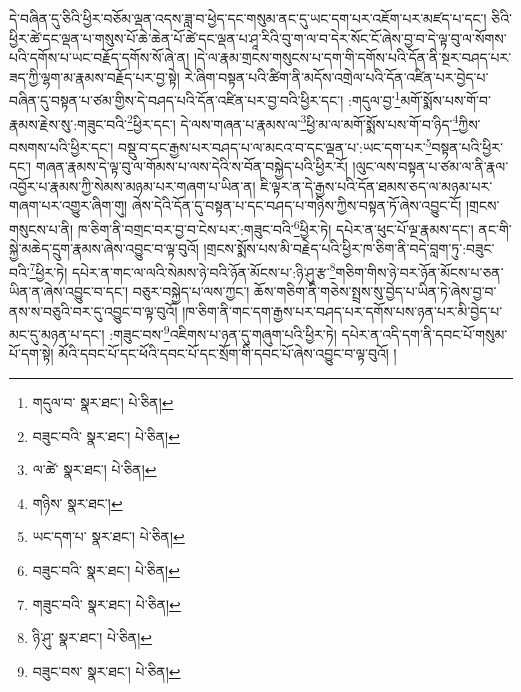 དེ་བཞིན་དུ་ཅིའི་ཕྱིར་བཅོམ་ལྡན་འདས་ཟླ་བ་ཕྱེད་དང་གསུམ་ནང་དུ་ཡང་དག་པར་འཇོག་པར་མཛད་པ་དང་། ཅིའི་ཕྱིར་ཚེ་དང་ལྡན་པ་གསུས་པོ་ཆེ་ཆེན་པོ་ཚེ་དང་ལྡན་པ་ཤཱ་རིའི་བུ་ག་ལ་བ་དེར་སོང་ངོ་ཞེས་བྱ་བ་དེ་ལྟ་བུ་ལ་སོགས་པའི་དགོས་པ་ཡང་བརྗོད་དགོས་སོ་ཞེ་ན། །དེ་ལ་རྣམ་གྲངས་གསུངས་པ་དག་གི་དགོས་པའི་དོན་ནི་སྔར་བཤད་པར་ཟད་ཀྱི་ལྷག་མ་རྣམས་བརྗོད་པར་བྱ་སྟེ། རེ་ཞིག་བསྟན་པའི་ཚིག་ནི་མདོས་འགྲེལ་པའི་དོན་འཛིན་པར་བྱེད་པ་བཞིན་དུ་བསྟན་པ་ཙམ་གྱིས་དེ་བཤད་པའི་དོན་འཛིན་པར་བྱ་བའི་ཕྱིར་དང་། :གདུལ་བྱ་\footnote{གདུལ་བ་  སྣར་ཐང་།  པེ་ཅིན། }མགོ་སྨོས་པས་གོ་བ་རྣམས་རྗེས་སུ་:གཟུང་བའི་\footnote{བཟུང་བའི་  སྣར་ཐང་།  པེ་ཅིན། }ཕྱིར་དང་། དེ་ལས་གཞན་པ་རྣམས་ལ་\footnote{ལ་ཚེ་  སྣར་ཐང་།  པེ་ཅིན། }ཕྱི་མ་ལ་མགོ་སྨོས་པས་གོ་བ་ཉིད་\footnote{གཉིས་  སྣར་ཐང་། }ཀྱིས་བསགས་པའི་ཕྱིར་དང་། བསྡུ་བ་དང་རྒྱས་པར་བཤད་པ་ལ་མངའ་བ་དང་ལྡན་པ་:ཡང་དག་པར་\footnote{ཡང་དག་པ་  སྣར་ཐང་།  པེ་ཅིན། }བསྟན་པའི་ཕྱིར་དང་། གཞན་རྣམས་དེ་ལྟ་བུ་ལ་གོམས་པ་ལས་དེའི་ས་བོན་བསྐྱེད་པའི་ཕྱིར་རོ། །ལུང་ལས་བསྟན་པ་ཙམ་ལ་ནི་རྣལ་འབྱོར་པ་རྣམས་ཀྱི་སེམས་མཉམ་པར་གཞག་པ་ཡིན་ན། ཇི་ལྟར་ན་དེ་རྒྱས་པའི་དོན་ཐམས་ཅད་ལ་མཉམ་པར་གཞག་པར་འགྱུར་ཞིག་གུ། ཞེས་དེའི་དོན་དུ་བསྟན་པ་དང་བཤད་པ་གཉིས་ཀྱིས་བསྟན་ཏོ་ཞེས་འབྱུང་ངོ། །གྲངས་གསུངས་པ་ནི། ཁ་ཅིག་ནི་བགྲང་བར་བྱ་བ་ངེས་པར་:གཟུང་བའི་\footnote{བཟུང་བའི་  སྣར་ཐང་།  པེ་ཅིན། }ཕྱིར་ཏེ། དཔེར་ན་ཕུང་པོ་ལྔ་རྣམས་དང་། ནང་གི་སྐྱེ་མཆེད་དྲུག་རྣམས་ཞེས་འབྱུང་བ་ལྟ་བུའོ། །གྲངས་སྨོས་པས་མི་བརྗེད་པའི་ཕྱིར་ཁ་ཅིག་ནི་བདེ་བླག་ཏུ་:བཟུང་བའི་\footnote{གཟུང་བའི་  སྣར་ཐང་།  པེ་ཅིན། }ཕྱིར་ཏེ། དཔེར་ན་གང་ལ་ལའི་སེམས་ཉེ་བའི་ཉོན་མོངས་པ་:ཉི་ཤུ་རྩ་\footnote{ཉི་ཤུ་  སྣར་ཐང་།  པེ་ཅིན། }གཅིག་གིས་ཉེ་བར་ཉོན་མོངས་པ་ཅན་ཡིན་ན་ཞེས་འབྱུང་བ་དང་། བཅུར་བསྐྱེད་པ་ལས་ཀྱང་། ཆོས་གཅིག་ནི་གཅེས་སྤྲས་སུ་བྱེད་པ་ཡིན་ཏེ་ཞེས་བྱ་བ་ནས་ས་བཅུའི་བར་དུ་འབྱུང་བ་ལྟ་བུའོ། །ཁ་ཅིག་ནི་གང་དག་རྒྱས་པར་བཤད་པར་དགོས་པས་ཉན་པར་མི་བྱེད་པ་མང་དུ་མཉན་པ་དང་། :གཟུང་བས་\footnote{བཟུང་བས་  སྣར་ཐང་།  པེ་ཅིན། }འཇིགས་པ་ཉན་དུ་གཞུག་པའི་ཕྱིར་ཏེ། དཔེར་ན་འདི་དག་ནི་དབང་པོ་གསུམ་པོ་དག་སྟེ། མོའི་དབང་པོ་དང་ཕོའི་དབང་པོ་དང་སྲོག་གི་དབང་པོ་ཞེས་འབྱུང་བ་ལྟ་བུའོ། །
